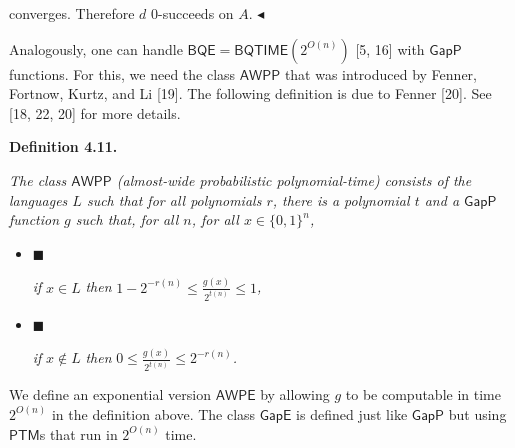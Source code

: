 converges. Therefore $d$ $0$-succeeds on $A$.
$\blacktriangleleft$\par




Analogously, one can handle $\mathsf{BQE}=\mathsf{BQTIME}(2^{O(n)})$ [5, 16]
with $\mathsf{GapP}$ functions. For this, we need the class $\mathsf{AWPP}$ that was introduced by Fenner, Fortnow, Kurtz, and Li [19].
The following definition is due to Fenner [20]. See [18, 22, 20] for more details.\par





\par\medskip\noindent\textbf{
\textbf{Definition 4.11}\textbf{.}
}\par



\emph{The class $\mathsf{AWPP}$ (almost-wide probabilistic polynomial-time) consists of
the languages $L$ such that for all polynomials $r$, there is a polynomial $t$ and a $\mathsf{GapP}$
function $g$ such that, for all $n$, for all $x\in\{0,1\}^{n}$,}\par


\begin{itemize}


\item[] 
$\blacksquare$ 


\emph{if }$x\in L$\emph{ then }$1-2^{-r(n)}\leq\frac{g(x)}{2^{t(n)}}\leq 1$\emph{,}\par





\item[] 
$\blacksquare$ 


\emph{if }$x\not\in L$\emph{ then }$0\leq\frac{g(x)}{2^{t(n)}}\leq 2^{-r(n)}$\emph{.}\par





\end{itemize}






We define an exponential version $\mathsf{AWPE}$ by allowing $g$ to be computable in time $2^{O(n)}$ in the definition above. The class $\mathsf{GapE}$ is defined just like $\mathsf{GapP}$ but using $\mathsf{PTM}$s that run in $2^{O(n)}$ time.\par



